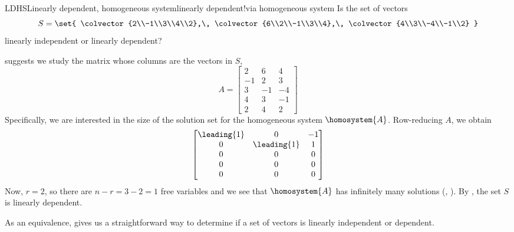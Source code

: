 %
%
\begin{example}{LDHS}{Linearly dependent, homogeneous system}{linearly dependent!via homogeneous system}
Is the set of vectors
%
\begin{equation*}
S=\set{
\colvector{2\\-1\\3\\4\\2},\,
\colvector{6\\2\\-1\\3\\4},\,
\colvector{4\\3\\-4\\-1\\2}
}
\end{equation*}
%
linearly independent or linearly dependent?\par
%
 suggests we study the matrix whose columns are the vectors in $S$,
%
\begin{equation*}
A=
\begin{bmatrix}
2 & 6 & 4\\ 
-1 & 2 & 3\\ 
3 & -1 & -4\\ 
4 & 3 & -1\\ 
2 & 4 & 2
\end{bmatrix}
\end{equation*}
%
Specifically, we are interested in the size of the solution set for the homogeneous system $\homosystem{A}$.  Row-reducing $A$, we obtain
%
\begin{equation*}
\begin{bmatrix}
\leading{1} & 0 & -1\\ 
0 & \leading{1} & 1\\ 
0 & 0 & 0\\ 
0 & 0 & 0\\ 
0 & 0 & 0
\end{bmatrix}
\end{equation*}
%
Now, $r=2$, so there are $n-r=3-2=1$ free variables and we see that $\homosystem{A}$ has infinitely many solutions (, ).  By , the set $S$ is linearly dependent.
%
\end{example}
%
As an equivalence,  gives us a straightforward way to determine if a set of vectors is linearly independent or dependent.  

